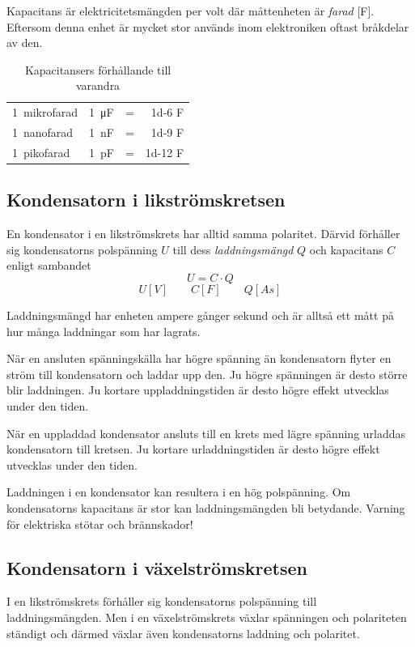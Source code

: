 Kapacitans är elektricitetsmängden per volt där måttenheten är \emph{farad} [F].
Eftersom denna enhet är mycket stor används inom elektroniken oftast bråkdelar
av den.

\begin{table}[h]
\begin{tabular}{llcr}
 \SI{1}{mikrofarad} & \SI{1}{\micro\farad} &=& \num{1d-6} F \\
 \SI{1}{nanofarad}  & \SI{1}{\nano\farad}  &=& \num{1d-9} F \\
 \SI{1}{pikofarad}  & \SI{1}{\pico\farad}  &=& \num{1d-12} F
\end{tabular}
\caption{Kapacitansers förhållande till varandra}
\end{table}

\subsection{Kondensatorn i likströmskretsen}

En kondensator i en likströmskrets har alltid samma polaritet.
Därvid förhåller sig kondensatorns polspänning \(U\) till dess
\emph{laddningsmängd} \(Q\) och kapacitans \(C\) enligt sambandet
\[ U = C \cdot Q \]
\[ 	U \unit{[V]} \qquad C \unit{[F]} \qquad Q \unit{[As]} \]

Laddningsmängd har enheten ampere gånger sekund och är alltså ett mått på hur
många laddningar som har lagrats.

När en ansluten spänningskälla har högre spänning än kondensatorn flyter en 
ström till kondensatorn och laddar upp den. Ju högre spänningen är desto större 
blir laddningen. Ju kortare uppladdningstiden är desto högre effekt
utvecklas under den tiden.

När en uppladdad kondensator ansluts till en krets med lägre spänning urladdas 
kondensatorn till kretsen. Ju kortare urladdningstiden är desto högre
effekt utvecklas under den tiden.

Laddningen i en kondensator kan resultera i en hög polspänning. Om kondensatorns
kapacitans är stor kan laddningsmängden bli betydande. Varning för elektriska
stötar och brännskador!

\subsection{Kondensatorn i växelströmskretsen}

I en likströmskrets förhåller sig kondensatorns polspänning till
laddningsmängden. Men i en växelströmskrets växlar spänningen och polariteten 
ständigt och därmed växlar även kondensatorns laddning och polaritet.

